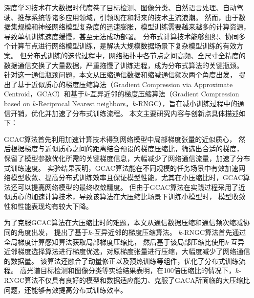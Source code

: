 
深度学习技术在大数据时代席卷了目标检测、图像分类、自然语言处理、自动驾驶、推荐系统等诸多应用领域，引领现在和将来的技术主流浪潮。
然而，由于数据集规模和神经网络模型复杂度的迅速膨胀，模型训练需要越来越多的计算资源，导致单机训练速度缓慢，甚至无法成功部署。
分布式计算技术能够组织、协同多个计算节点进行网络模型训练，是解决大规模数据场景下复杂模型训练的有效方案。
但分布式训练的迭代过程中，网络拓扑中各节点之间高频、全尺寸全精度的数据通信交换了大量数据，严重拖慢了训练进程，成为分布式算法的关键瓶颈。
针对这一通信瓶颈问题，本文从压缩通信数据和缩减通信频次两个角度出发，
提出了基于近似质心的梯度压缩算法（Gradient Compression via Approximate Centroid，GCAC）和基于$k$-互异近邻的梯度压缩算法（Gradient Compression based on $k$-Reciprocal Nearest neighbors，$k$-RNGC），旨在减小训练过程中的通信开销，优化并加速了分布式训练流程。
本文主要研究内容与创新点具体描述如下：

GCAC算法首先利用加速计算技术得到网络模型中局部梯度张量的近似质心，
然后根据梯度与近似质心之间的距离结合预设的梯度压缩比，筛选出合适的梯度，
保留了模型参数优化所需的关键梯度信息，大幅减少了网络通信流量，加速了分布式训练速度。
实验结果表明，GCAC算法能在不同规模的任务场景中有效加速网络模型收敛、提高分布式训练效率且保证模型性能，尤其在小压缩比时，GCAC算法还可以提高网络模型的最终收敛精度。
但由于GCAC算法在实践过程采用了近似质心的加速计算技术，导致该算法在大压缩比场景下训练小模型时，
模型收敛性和性能表现均有较大下降。

为了克服GCAC算法在大压缩比时的难题，本文从通信数据压缩和通信频次缩减协同的角度出发，
提出了基于$k$-互异近邻的梯度压缩算法。
$k$-RNGC算法首先通过全局梯度计算感知算法获取局部梯度压缩比，
然后基于该局部压缩比使用$k$-互异近邻梯度选择算法进行梯度优选，对原梯度张量进行压缩，大幅度减少了网络通信的数据量。
该算法还融合了动量修正以及预热训练等组件，优化了分布式训练流程。
高光谱目标检测和图像分类等实验结果表明，在100倍压缩比的情况下，$k$-RNGC算法不仅具有良好的模型和数据适应能力、克服了GACA所面临的大压缩比问题，还能够有效提高分布式训练效率。

